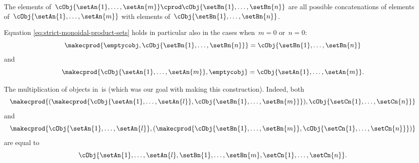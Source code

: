 The elements of~$\cObj{\setAn{1}, \ldots, \setAn{m}} \cprod \cObj{\setBn{1}, \ldots, \setBn{n}}$ are all possible concatenations of elements of~$\cObj{\setAn{1}, \ldots, \setAn{m}}$ with elements of~$\cObj{\setBn{1}, \ldots, \setBn{n}}$.

Equation \cref{eq:strict-monoidal-product-sets} holds in particular also in the cases when~$m = 0$ or~$n =0$:
\begin{equation}
    \makecprod{
        \emptycobj,
        \cObj{\setBn{1}, \ldots, \setBn{n}}
    } =
    \cObj{
        \setBn{1}, \ldots, \setBn{n}
    }
\end{equation}
and
\begin{equation}
    \makecprod{
        \cObj{\setAn{1}, \ldots, \setAn{m}},
        \emptycobj
    } =
    \cObj{
        \setAn{1}, \ldots, \setAn{m}
    }.
\end{equation}


The multiplication of objects in~\SetL is  (which was our goal with making this construction).
Indeed, both
\begin{equation}
    \makecprod{
        ( \makecprod{\cObj{\setAn{1}, \ldots, \setAn{l}}, \cObj{\setBn{1}, \ldots, \setBn{m}}})
        ,
        \cObj{\setCn{1}, \ldots, \setCn{n}}
    }
\end{equation}
and
\begin{equation}
    \makecprod{
        \cObj{\setAn{1}, \ldots, \setAn{l}},
        (
        \makecprod{
            \cObj{\setBn{1}, \ldots, \setBn{m}},
            \cObj{\setCn{1}, \ldots, \setCn{n}}
        }
        )
    }
\end{equation}
are equal to
\begin{equation}
    \cObj{\setAn{1}, \ldots, \setAn{l}, \setBn{1}, \ldots, \setBn{m}, \setCn{1}, \ldots, \setCn{n}}.
\end{equation}

